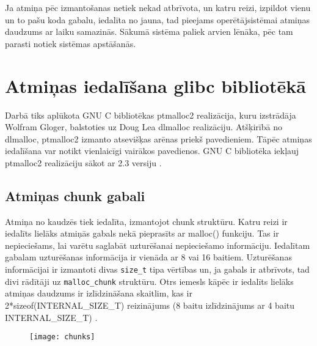 Ja atmiņa pēc izmantošanas netiek nekad atbrīvota, un katru reizi, izpildot vienu un to pašu koda gabalu, iedalīta no jauna, tad pieejams operētājsistēmai atmiņas daudzums ar laiku samazinās.
Sākumā sistēma paliek arvien lēnāka, pēc tam parasti notiek sistēmas apstāšanās.






\section{Atmiņas iedalīšana glibc bibliotēkā}
Darbā tiks aplūkota GNU C bibliotēkas ptmalloc2 realizācija, kuru izstrādāja Wolfram Gloger, balstoties uz Doug Lea dlmalloc realizāciju. 
Atšķirībā no dlmalloc, ptmalloc2 izmanto atsevišķas arēnas priekš pavedieniem.
Tāpēc atmiņas iedalīšana var notikt vienlaicīgi vairākos pavedienos.
GNU C bibliotēka iekļauj ptmalloc2 realizāciju sākot ar 2.3 versiju \cite {MWIKI}. 

\subsection{Atmiņas chunk gabali}
Atmiņa no kaudzēs tiek iedalīta, izmantojot chunk struktūru.
Katru reizi ir iedalīts lielāks atmiņās gabals nekā pieprasīts ar malloc() funkciju.
Tas ir nepieciešams, lai varētu saglabāt uzturēšanai nepieciešamo informāciju. Iedalītam gabalam uzturēšanas informācija ir vienāda ar 8 vai 16 baitiem.
Uzturēšanas informācijai ir izmantoti divas \texttt{size\_t} tipa vērtības un, ja gabals ir atbrīvots, tad divi rādītāji uz \texttt{malloc\_chunk} struktūru. 
Otrs iemesls kāpēc ir iedalīts lielāks atmiņas daudzums ir izlīdzināšana skaitlim, kas ir 2*sizeof(INTERNAL\_SIZE\_T) reizinājums (8 baitu izlīdzinājums ar 4 baitu INTERNAL\_SIZE\_T) \cite {MALLOC}.  


\begin{figure}[h]
\begin{center}
\texttt{[image: chunks]}
\end{center}
\caption{\textbf{\fontsize{11}{12}\selectfont {Atmiņas gabalu struktūra}}}
\label{fig:chunks}
\end{figure}

